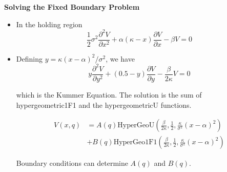 \documentclass{beamer}
\begin{document}
\begin{frame}
{\bf Solving the Fixed Boundary Problem}
\begin{itemize}
  \item In the holding region
  \begin{equation*}
  \frac{1}{2} \sigma^2 \frac{\partial^2 V}{\partial x^2} + \alpha (\kappa - x) \frac{\partial V}{\partial x} - \beta V = 0
\end{equation*}

\item Defining $y = \kappa (x-\alpha)^2/\sigma^2$, we have
\begin{equation*}
  y \frac{\partial^2 V}{\partial y^2} + (0.5 - y) \frac{\partial V}{\partial y} -\frac{\beta}{2\kappa} V = 0
\end{equation*}

which is the Kummer Equation. The solution is the sum of hypergeometric1F1 and the hypergeometricU functions.

\begin{equation*}
\begin{split}
  V(x,q) &= A(q)\text{HyperGeoU}\left(\frac{\beta}{2\kappa},\frac{1}{2},\frac{\kappa}{\sigma^2}(x-\alpha)^2\right) \\
  &+ B(q)\text{HyperGeo1F1}\left(\frac{\beta}{2\kappa},\frac{1}{2},\frac{\kappa}{\sigma^2}(x-\alpha)^2\right)
  \end{split}
\end{equation*}

Boundary conditions can determine $A(q)$ and $B(q)$.

\end{itemize}

\end{frame}
\end{document}
